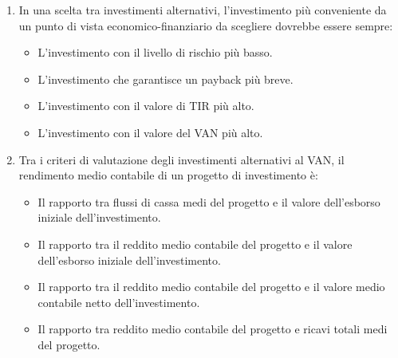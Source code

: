 \documentclass{article}
\begin{document}
\begin{enumerate}
    \item In una scelta tra investimenti alternativi, l'investimento più conveniente da un punto di vista economico-finanziario da scegliere dovrebbe essere sempre:
          \begin{itemize}
              \item[\sout{A.}] L'investimento con il livello di rischio più basso.
              \item[\sout{B.}] L'investimento che garantisce un payback più breve.
              \item[\sout{C.}] L'investimento con il valore di TIR più alto.
              \item[\checkmark] L'investimento con il valore del VAN più alto.
          \end{itemize}

    \item Tra i criteri di valutazione degli investimenti alternativi al VAN, il rendimento medio contabile di un progetto di investimento è:
          \begin{itemize}
              \item[\sout{A.}] Il rapporto tra flussi di cassa medi del progetto e il valore dell'esborso iniziale dell'investimento.
              \item[\sout{B.}] Il rapporto tra il reddito medio contabile del progetto e il valore dell'esborso iniziale dell'investimento.
              \item[\checkmark] Il rapporto tra il reddito medio contabile del progetto e il valore medio contabile netto dell'investimento.
              \item[\sout{C.}] Il rapporto tra reddito medio contabile del progetto e ricavi totali medi del progetto.
          \end{itemize}
\end{enumerate}
\newpage
\end{document}
